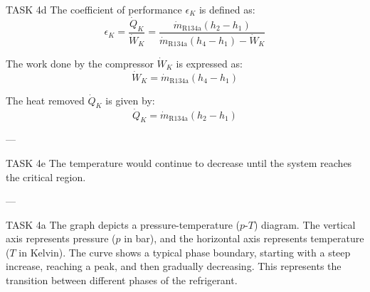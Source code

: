 TASK 4d  
The coefficient of performance \( \epsilon_K \) is defined as:  
\[
\epsilon_K = \frac{\dot{Q}_K}{\dot{W}_K} = \frac{\dot{m}_{\text{R134a}} (h_2 - h_1)}{\dot{m}_{\text{R134a}} (h_4 - h_1) - \dot{W}_K}
\]  

The work done by the compressor \( \dot{W}_K \) is expressed as:  
\[
\dot{W}_K = \dot{m}_{\text{R134a}} (h_4 - h_1)
\]  

The heat removed \( \dot{Q}_K \) is given by:  
\[
\dot{Q}_K = \dot{m}_{\text{R134a}} (h_2 - h_1)
\]  

---

TASK 4e  
The temperature would continue to decrease until the system reaches the critical region.  

---

TASK 4a  
The graph depicts a pressure-temperature (\( p \)-\( T \)) diagram. The vertical axis represents pressure (\( p \) in bar), and the horizontal axis represents temperature (\( T \) in Kelvin). The curve shows a typical phase boundary, starting with a steep increase, reaching a peak, and then gradually decreasing. This represents the transition between different phases of the refrigerant.